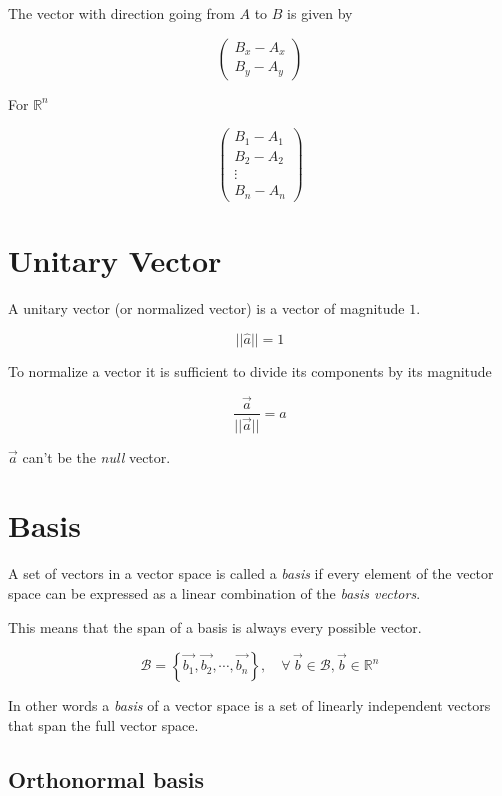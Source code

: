 \documentclass{article}
\begin{document}
The vector with direction going from \(A\) to \(B\) is given by

\[
    \begin{pmatrix}
        B_x - A_x \\
        B_y - A_y
    \end{pmatrix}
\]

For \({{\mathbb{R}}^n}\)

\[
    \begin{pmatrix}
        B_1 - A_1 \\
        B_2 - A_2 \\
        \vdots \\
        B_n - A_n
    \end{pmatrix}
\]

\section{Unitary Vector}

A unitary vector (or normalized vector) is a vector of magnitude \(1\).

\[
    ||\hat{a}|| = 1
\]

To normalize a vector it is sufficient to divide its components by its magnitude

\[
    \frac{\vec{a}}{||\vec{a}||}=\hat{a}
\]

\(\vec{a}\) can't be the \textit{null} vector.

\section{Basis}

A set of vectors in a vector space is called a \textit{basis} if every element
of the vector space can be expressed as a linear combination of the \textit{basis vectors}.

This means that the span of a basis is always every possible vector.

\[
    \mathcal{B} =
    \left\{
        \vec{b_1}, 
        \vec{b_2}, 
        \cdots,
        \vec{b_n}
    \right\},
    \quad \forall\, \vec{b} \in \mathcal{B}, \vec{b} \in {\mathbb{R}}^n
\]

In other words a \textit{basis} of a vector space is a set of
linearly independent vectors that span the full vector space.

\subsection{Orthonormal basis}
\end{document}
